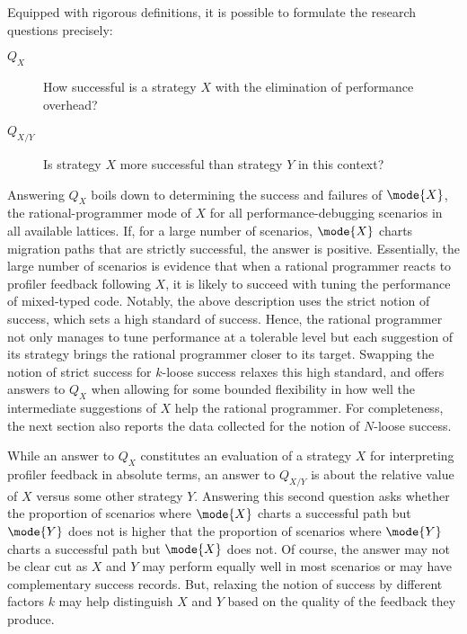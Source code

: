 
Equipped with rigorous definitions, it is possible to formulate the research
questions precisely:
\begin{description}

\item[$Q_X$] How successful is a strategy $X$ with the elimination of
  performance overhead?

\item[$Q_{X/Y}$] Is strategy $X$ more successful than strategy $Y$ in this
  context?
  
\end{description}

Answering $Q_X$ boils down to determining the success and failures of
$\mode{X}$, the rational-programmer mode of $X$ for all performance-debugging
scenarios in all available lattices. If, for a large number of scenarios,
$\mode{X}$ charts migration paths that are strictly successful, the answer is
positive. Essentially, the large number of scenarios is evidence that when a
rational programmer reacts to profiler feedback following $X$, it is likely to
succeed with tuning the performance of mixed-typed code. Notably, the above
description uses the strict notion of success, which sets a high standard of
success. Hence, the rational programmer not only manages to tune performance at
a tolerable level but each suggestion of its strategy brings the rational
programmer closer to its target. Swapping the notion of strict success for
$k$-loose success relaxes this high standard, and offers answers to $Q_X$ when
allowing for some bounded flexibility in how well the intermediate suggestions
of $X$ help the rational programmer. For completeness, the next section also
reports the data collected for the notion of $N$-loose success.

While an answer to $Q_X$ constitutes an evaluation of a strategy $X$ for
interpreting profiler feedback in absolute terms, an answer to $Q_{X/Y}$ is
about the relative value of $X$ versus some other strategy
$Y$. Answering this second question asks whether the proportion of scenarios
where $\mode{X}$ charts a successful path but $\mode{Y}$ does not is higher that
the proportion of scenarios where $\mode{Y}$ charts a successful path but
$\mode{X}$ does not. Of course, the answer may not be clear cut as $X$ and $Y$
may perform equally well in most scenarios or may have complementary success
records. But, relaxing the notion of success by different factors $k$ may
help distinguish $X$ and $Y$ based on the quality of the feedback they produce.


